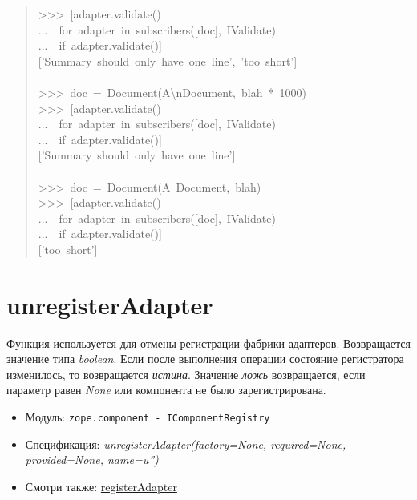 \documentclass[a4paper,openany,twoside,final]{book}
\providecommand*{\DUroletitlereference}[1]{\textsl{#1}}
\begin{document}
\begin{quote}
{>{}>{}>~{[}adapter.validate()\\
...~~for~adapter~in~subscribers({[}doc{]},~IValidate)\\
...~~if~adapter.validate(){]}\\
{[}'Summary~should~only~have~one~line',~'too~short'{]}\\
~\\
>{}>{}>~doc~=~Document(\textquotedbl{}A\textbackslash{}nDocument\textquotedbl{},~\textquotedbl{}blah\textquotedbl{}~*~1000)\\
>{}>{}>~{[}adapter.validate()\\
...~~for~adapter~in~subscribers({[}doc{]},~IValidate)\\
...~~if~adapter.validate(){]}\\
{[}'Summary~should~only~have~one~line'{]}\\
~\\
>{}>{}>~doc~=~Document(\textquotedbl{}A~Document\textquotedbl{},~\textquotedbl{}blah\textquotedbl{})\\
>{}>{}>~{[}adapter.validate()\\
...~~for~adapter~in~subscribers({[}doc{]},~IValidate)\\
...~~if~adapter.validate(){]}\\
{[}'too~short'{]}
}
\end{quote}


\section*{unregisterAdapter%
  \label{unregisteradapter}%
}

Функция используется для отмены регистрации фабрики адаптеров.
Возвращается значение типа \DUroletitlereference{boolean}.  Если после выполнения операции
состояние регистратора изменилось, то возвращается \DUroletitlereference{истина}.  Значение
\DUroletitlereference{ложь} возвращается, если параметр равен \DUroletitlereference{None} или компонента не было
зарегистрирована.

\begin{itemize}

\item Модуль: \texttt{zope.component - IComponentRegistry}

\item Спецификация: \DUroletitlereference{unregisterAdapter(factory=None, required=None,
provided=None, name=u'')}

\item Смотри также: \hyperref[registeradapter]{registerAdapter}

\end{itemize}
\end{document}

